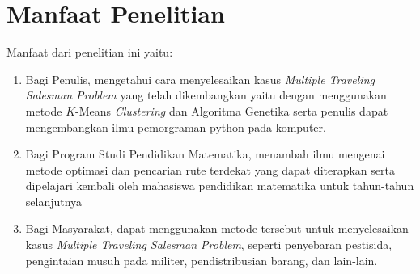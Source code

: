 
\section{Manfaat Penelitian}

Manfaat dari penelitian ini yaitu:
\begin{enumerate}
	\item Bagi Penulis, mengetahui cara menyelesaikan kasus \textit{Multiple Traveling Salesman Problem} yang telah dikembangkan yaitu dengan menggunakan metode $K$-Means \textit{Clustering} dan Algoritma Genetika serta penulis dapat mengembangkan ilmu pemorgraman python pada komputer.

	\item Bagi Program Studi Pendidikan Matematika, menambah ilmu mengenai metode optimasi dan pencarian rute terdekat yang dapat diterapkan serta dipelajari kembali oleh mahasiswa pendidikan matematika untuk tahun-tahun selanjutnya
	
	\item Bagi Masyarakat, dapat menggunakan metode tersebut untuk menyelesaikan kasus \textit{Multiple Traveling Salesman Problem}, seperti penyebaran pestisida, pengintaian musuh pada militer, pendistribusian barang, dan lain-lain.
	
\end{enumerate}
